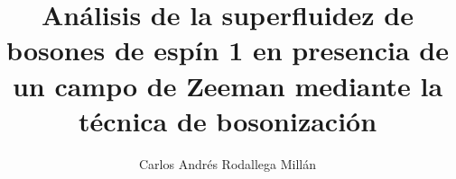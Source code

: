 \documentclass[english, report, 12pt]{reyesThesis}
\author{Carlos Andrés Rodallega Millán}
\title{Análisis de la superfluidez de bosones de espín 1 en presencia de un campo de Zeeman mediante la técnica de \phantom{'} bosonización\phantom{'} }
\begin{document}





%
%

%
%


\begin{appendices}

%
%
%
%
%
%
%
%
\end{appendices}


\end{document}
